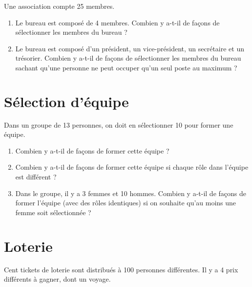 \documentclass[a4paper,11pt]{article}
\begin{document}
Une association compte 25 membres.

\begin{enumerate}
\item Le bureau est composé de 4 membres. Combien y a-t-il de façons de sélectionner les membres du bureau ?

\item Le bureau est composé d'un président, un vice-président, un secrétaire et un trésorier. Combien y a-t-il de façons de sélectionner les membres du bureau sachant qu'une personne ne peut occuper qu'un seul poste au maximum ?
\end{enumerate}

\section{Sélection d'équipe}

Dans un groupe de 13 personnes, on doit en sélectionner 10 pour former une équipe.

\begin{enumerate}
\item Combien y a-t-il de façons de former cette équipe ?

\item Combien y a-t-il de façons de former cette équipe si chaque rôle dans l'équipe est différent ?

\item Dans le groupe, il y a 3 femmes et 10 hommes. Combien y a-t-il de façons de former l'équipe (avec des rôles identiques) si on souhaite qu'au moins une femme soit sélectionnée ?
\end{enumerate}

\section{Loterie}

Cent tickets de loterie sont distribués à 100 personnes différentes. Il y a 4 prix différents à gagner, dont un voyage.
\end{document}
